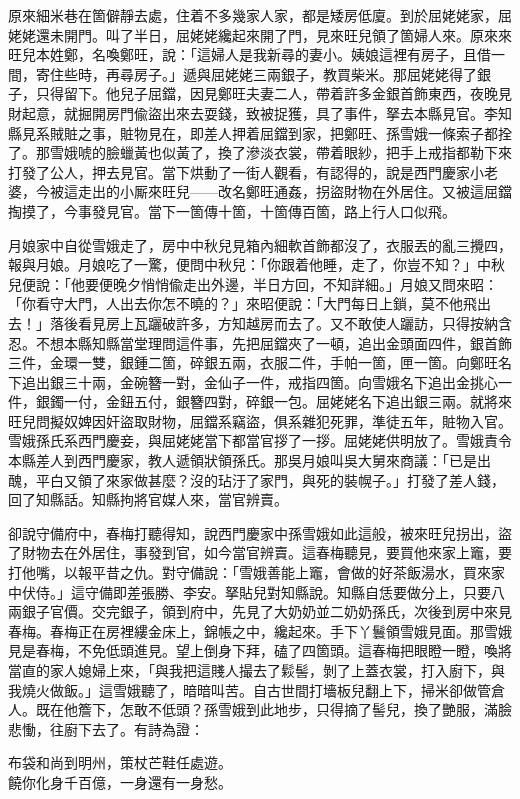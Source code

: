 原來細米巷在箇僻靜去處，住着不多幾家人家，都是矮房低廈。到於屈姥姥家，屈姥姥還未開門。叫了半日，屈姥姥纔起來開了門，見來旺兒領了箇婦人來。原來來旺兒本姓鄭，名喚鄭旺，說：「這婦人是我新尋的妻小。姨娘這裡有房子，且借一間，寄住些時，再尋房子。」遞與屈姥姥三兩銀子，教買柴米。那屈姥姥得了銀子，只得留下。他兒子屈鐺，因見鄭旺夫妻二人，帶着許多金銀首飾東西，夜晚見財起意，就掘開房門偸盜出來去耍錢，致被捉獲，具了事件，拏去本縣見官。李知縣見系賊賍之事，賍物見在，即差人押着屈鐺到家，把鄭旺、孫雪娥一條索子都拴了。那雪娥唬的臉蠟黃也似黃了，換了滲淡衣裳，帶着眼紗，把手上戒指都勒下來打發了公人，押去見官。當下烘動了一街人觀看，有認得的，說是西門慶家小老婆，今被這走出的小厮來旺兒——改名鄭旺通姦，拐盜財物在外居住。又被這屈鐺掏摸了，今事發見官。當下一箇傳十箇，十箇傳百箇，路上行人口似飛。{}

月娘家中自從雪娥走了，房中中秋兒見箱內細軟首飾都沒了，衣服丟的亂三攪四，報與月娘。月娘吃了一驚，便問中秋兒：「你跟着他睡，走了，你豈不知？」中秋兒便說：「他要便晚夕悄悄偸走出外邊，半日方回，不知詳細。」月娘又問來昭：「你看守大門，人出去你怎不曉的？」來昭便說：「大門每日上鎖，莫不他飛出去！」落後看見房上瓦躧破許多，方知越房而去了。又不敢使人躧訪，只得按納含忍。不想本縣知縣當堂理問這件事，先把屈鐺夾了一頓，追出金頭面四件，銀首飾三件，金環一雙，銀鍾二箇，碎銀五兩，衣服二件，手帕一箇，匣一箇。向鄭旺名下追出銀三十兩，金碗簪一對，金仙子一件，戒指四箇。向雪娥名下追出金挑心一件，銀鐲一付，金鈕五付，銀簪四對，碎銀一包。屈姥姥名下追出銀三兩。就將來旺兒問擬奴婢因奸盜取財物，屈鐺系竊盜，俱系雜犯死罪，準徒五年，賍物入官。雪娥孫氏系西門慶妾，與屈姥姥當下都當官拶了一拶。屈姥姥供明放了。雪娥責令本縣差人到西門慶家，教人遞領狀領孫氏。那吳月娘叫吳大舅來商議：「已是出醜，平白又領了來家做甚麼？{}沒的玷汙了家門，與死的裝幌子。」打發了差人錢，回了知縣話。知縣拘將官媒人來，當官辨賣。

卻說守備府中，春梅打聽得知，說西門慶家中孫雪娥如此這般，被來旺兒拐出，盜了財物去在外居住，事發到官，如今當官辨賣。這春梅聽見，要買他來家上竈，要打他嘴，以報平昔之仇。對守備說：「雪娥善能上竈，會做的好茶飯湯水，買來家中伏侍。」這守備即差張勝、李安。拏貼兒對知縣說。知縣自恁要做分上，只要八兩銀子官價。交完銀子，領到府中，先見了大奶奶並二奶奶孫氏，次後到房中來見春梅。春梅正在房裡縷金床上，錦帳之中，纔起來。{}手下丫鬟領雪娥見面。那雪娥見是春梅，不免低頭進見。望上倒身下拜，磕了四箇頭。這春梅把眼瞪一瞪，{}喚將當直的家人媳婦上來，「與我把這賤人撮去了鬏髻，剝了上蓋衣裳，打入廚下，與我燒火做飯。」這雪娥聽了，暗暗叫苦。自古世間打墻板兒翻上下，掃米卻做管倉人。既在他簷下，怎敢不低頭？孫雪娥到此地步，只得摘了髻兒，換了艷服，滿臉悲慟，往廚下去了。有詩為證：

\begin{myquote}
布袋和尚到明州，策杖芒鞋任處遊。\\饒你化身千百億，一身還有一身愁。
\end{myquote}

